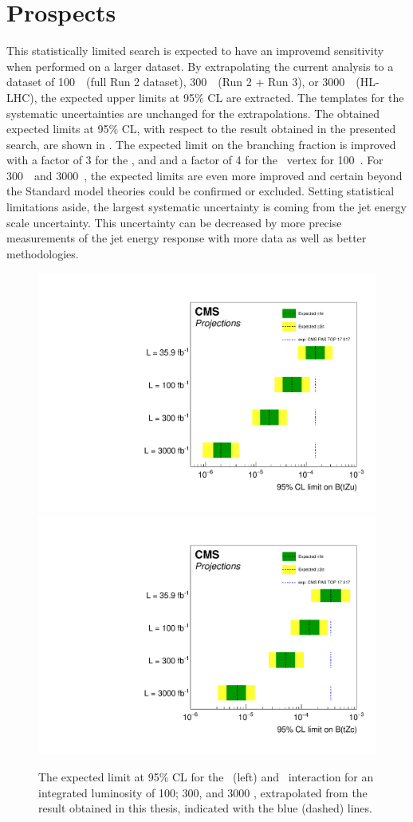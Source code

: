 \section{Prospects}
This statistically limited search is expected to have an improvemd sensitivity when performed on a larger dataset. By extrapolating the current analysis to a dataset of 100~\fbinv\ (full Run 2 dataset), 300~\fbinv\ (Run 2 + Run 3), or 3000~\fbinv\ (HL-LHC), the expected upper limits at 95\% CL are  extracted. %
The templates for the systematic uncertainties are unchanged for the extrapolations. The obtained expected limits at 95\% CL, with respect to the result obtained in the presented search, are shown in .  The expected limit on the branching fraction is improved with a factor of 3 for the \Zut, and and a factor of 4 for the \Zct\ vertex for 100~\fbinv. For 300~\fbinv\ and 3000~\fbinv, the expected limits are even more improved and certain beyond the Standard model theories could be confirmed or excluded. Setting statistical limitations aside, the largest systematic uncertainty is coming from the jet energy scale uncertainty. This uncertainty can be decreased by more precise measurements of the jet energy response with more data as well as better methodologies. %
\begin{figure}
	\centering
	\includegraphics[width=0.49\linewidth]{7_Conclusion/Figures/TOP-17-017_limitsZutProj.pdf}
	\includegraphics[width=0.49\linewidth]{7_Conclusion/Figures/TOP-17-017_limitsZctproj.pdf}
	\caption{The expected limit at 95\% CL for the \Zut\ (left) and \Zct\ interaction for an integrated luminosity of 100; 300, and 3000 \fbinv, extrapolated from the result obtained in this thesis, indicated with the blue (dashed) lines. }
	\label{fig:proj} %
\end{figure}


